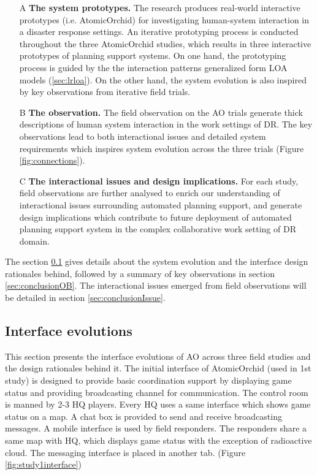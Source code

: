 \begin{enumerate}
  \item[A] \textbf{The system prototypes.} The research produces real-world interactive prototypes (i.e. AtomicOrchid) for investigating human-system interaction in a disaster response settings. An iterative prototyping process is conducted throughout the three AtomicOrchid studies, which results in three interactive prototypes of planning support systems. On one hand, the prototyping process is guided by the the interaction patterns generalized form \ac{LOA} models (\ref{sec:lrloa}). On the other hand, the system evolution is also inspired by key observations from iterative field trials. 
  
  \item[B] \textbf{The observation.} The field observation on the \ac{AO} trials generate thick descriptions of human system interaction in the work settings of \ac{DR}. The key observations lead to both interactional issues and detailed system requirements which inspires system evolution across the three trials (Figure \ref{fig:connections}).
  
  \item[C] \textbf{The interactional issues and design implications.} For each study, field observations are further analysed to enrich our understanding of interactional issues surrounding automated planning support, and generate design implications which contribute to future deployment of automated planning support system in the complex collaborative work setting of DR domain. 
\end{enumerate}

The section \ref{sec:conclusionIE} gives details about the system evolution and the interface design rationales behind, followed by a summary of key observations in section \ref{sec:conclusionOB}. The interactional issues emerged from field observations will be detailed in section \ref{sec:conclusionIssue}. \\



\subsection{Interface evolutions}\label{sec:conclusionIE}
This section presents the interface evolutions of \acf{AO} across three field studies and the design rationales behind it. The initial interface of AtomicOrchid (used in 1st study) is designed to provide basic coordination support by displaying game status and providing broadcasting channel for communication. The control room is manned by 2-3 HQ players. Every HQ uses a same interface which shows game status on a map. A chat box is provided to send and receive broadcasting messages. A mobile interface is used by field responders. The responders share a same map with HQ, which displays game status with the exception of radioactive cloud. The messaging interface is placed in another tab. (Figure \ref{fig:study1interface})\\ 

